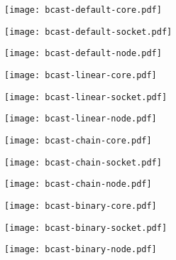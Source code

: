 \documentclass[../main.tex]{subfiles}
\begin{document}
\begin{figure}[p]
    \begin{adjustwidth}{-1.5cm}{-1.5cm}
    \centering
    \begin{minipage}{0.40\textwidth}
        \centering
        \texttt{[image: bcast-default-core.pdf]}
    \end{minipage}\hfill
    \begin{minipage}{0.40\textwidth}
        \centering
        \texttt{[image: bcast-default-socket.pdf]}
    \end{minipage}\hfill
    \begin{minipage}{0.40\textwidth}
        \centering
        \texttt{[image: bcast-default-node.pdf]}
    \end{minipage}
    \begin{minipage}{0.40\textwidth}
        \centering
        \texttt{[image: bcast-linear-core.pdf]}
    \end{minipage}\hfill
    \begin{minipage}{0.40\textwidth}
        \centering
        \texttt{[image: bcast-linear-socket.pdf]}
    \end{minipage}\hfill
    \begin{minipage}{0.40\textwidth}
        \centering
        \texttt{[image: bcast-linear-node.pdf]}
    \end{minipage}
    \begin{minipage}{0.40\textwidth}
        \centering
        \texttt{[image: bcast-chain-core.pdf]}
    \end{minipage}\hfill
    \begin{minipage}{0.40\textwidth}
        \centering
        \texttt{[image: bcast-chain-socket.pdf]}
    \end{minipage}\hfill
    \begin{minipage}{0.40\textwidth}
        \centering
        \texttt{[image: bcast-chain-node.pdf]}
    \end{minipage}
    \begin{minipage}{0.40\textwidth}
        \centering
        \texttt{[image: bcast-binary-core.pdf]}
    \end{minipage}\hfill
    \begin{minipage}{0.40\textwidth}
        \centering
        \texttt{[image: bcast-binary-socket.pdf]}
    \end{minipage}\hfill
    \begin{minipage}{0.40\textwidth}
        \centering
        \texttt{[image: bcast-binary-node.pdf]}
    \end{minipage}
    \end{adjustwidth}
    

\end{figure}
\end{document}
